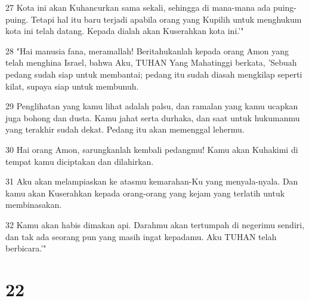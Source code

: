 \par 27 Kota ini akan Kuhancurkan sama sekali, sehingga di mana-mana ada puing-puing. Tetapi hal itu baru terjadi apabila orang yang Kupilih untuk menghukum kota ini telah datang. Kepada dialah akan Kuserahkan kota ini.'"
\par 28 "Hai manusia fana, meramallah! Beritahukanlah kepada orang Amon yang telah menghina Israel, bahwa Aku, TUHAN Yang Mahatinggi berkata, 'Sebuah pedang sudah siap untuk membantai; pedang itu sudah diasah mengkilap seperti kilat, supaya siap untuk membunuh.
\par 29 Penglihatan yang kamu lihat adalah palsu, dan ramalan yang kamu ucapkan juga bohong dan dusta. Kamu jahat serta durhaka, dan saat untuk hukumanmu yang terakhir sudah dekat. Pedang itu akan memenggal lehermu.
\par 30 Hai orang Amon, sarungkanlah kembali pedangmu! Kamu akan Kuhakimi di tempat kamu diciptakan dan dilahirkan.
\par 31 Aku akan melampiaskan ke atasmu kemarahan-Ku yang menyala-nyala. Dan kamu akan Kuserahkan kepada orang-orang yang kejam yang terlatih untuk membinasakan.
\par 32 Kamu akan habis dimakan api. Darahmu akan tertumpah di negerimu sendiri, dan tak ada seorang pun yang masih ingat kepadamu. Aku TUHAN telah berbicara.'"

\chapter{22}

